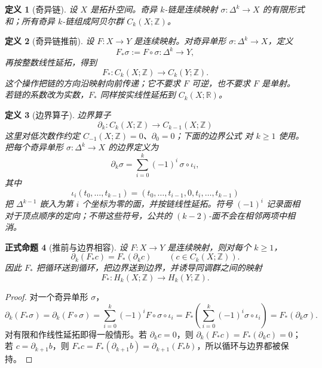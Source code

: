 \documentclass[UTF8,fontset=none,a4paper,11pt]{ctexart}
\theoremstyle{foundation-definition}
\newtheorem{definition}{定义}[section]
\theoremstyle{foundation-theorem}
\theoremstyle{foundation-proposition}
\newtheorem{proposition}[definition]{正式命题}
\theoremstyle{foundation-example}
\theoremstyle{foundation-remark}
\theoremstyle{foundation-theorem}
\begin{document}
\begin{definition}[奇异链]\label{def:singular-chain}
设 \(X\) 是拓扑空间。奇异 \(k\)-链是连续映射 \(\sigma:\Delta^k\to X\) 的有限形式和；所有奇异 \(k\)-链组成阿贝尔群 \(C_k(X;\mathbb Z)\)。
\end{definition}

\begin{definition}[奇异链推前]\label{def:chain-pushforward}
设 \(F:X\to Y\) 是连续映射。对奇异单形 \(\sigma:\Delta^k\to X\)，定义
\[
F_*\sigma:=F\circ\sigma:\Delta^k\to Y,
\]
再按整数线性延拓，得到
\[
F_*:C_k(X;\mathbb Z)\longrightarrow C_k(Y;\mathbb Z).
\]
这个操作把链的方向沿映射向前传递；它不要求 \(F\) 可逆，也不要求 \(F\) 是单射。
若链的系数改为实数，\(F_*\) 同样按实线性延拓到 \(C_k(X;\mathbb R)\)。
\end{definition}

\begin{definition}[边界算子]\label{def:boundary-operator}
边界算子
\[
\partial_k:C_k(X;\mathbb Z)\longrightarrow C_{k-1}(X;\mathbb Z)
\]
这里对低次数作约定 \(C_{-1}(X;\mathbb Z)=0\)、\(\partial_0=0\)；下面的边界公式
对 \(k\geq1\) 使用。
把每个奇异单形 \(\sigma:\Delta^k\to X\) 的边界定义为
\[
\partial_k\sigma=\sum_{i=0}^{k}(-1)^i\,\sigma\circ\iota_i,
\]
其中
\[
\iota_i(t_0,\ldots,t_{k-1})
=(t_0,\ldots,t_{i-1},0,t_i,\ldots,t_{k-1})
\]
把 \(\Delta^{k-1}\) 嵌入为第 \(i\) 个坐标为零的面，并按链线性延拓。符号 \((-1)^i\)
记录面相对于顶点顺序的定向；不带这些符号，公共的 \((k-2)\)-面不会在相邻两项中相消。
\end{definition}

\begin{proposition}[推前与边界相容]\label{prop:boundary-pushforward}
设 \(F:X\to Y\) 是连续映射，则对每个 \(k\geq1\)，
\[
\partial_k(F_*c)=F_*(\partial_kc)
\qquad(c\in C_k(X;\mathbb Z)).
\]
因此 \(F_*\) 把循环送到循环，把边界送到边界，并诱导同调群之间的映射
\[
F_*:H_k(X;\mathbb Z)\longrightarrow H_k(Y;\mathbb Z).
\]
\end{proposition}

\begin{proof}
对一个奇异单形 \(\sigma\)，
\[
\partial_k(F_*\sigma)
=\partial_k(F\circ\sigma)
=\sum_{i=0}^k(-1)^iF\circ\sigma\circ\iota_i
=F_*\left(\sum_{i=0}^k(-1)^i\sigma\circ\iota_i\right)
=F_*(\partial_k\sigma).
\]
对有限和作线性延拓即得一般情形。若 \(\partial_kc=0\)，则
\(\partial_k(F_*c)=F_*(\partial_kc)=0\)；若 \(c=\partial_{k+1}b\)，则
\(F_*c=F_*(\partial_{k+1}b)=\partial_{k+1}(F_*b)\)，所以循环与边界都被保持。
\end{proof}
\end{document}
